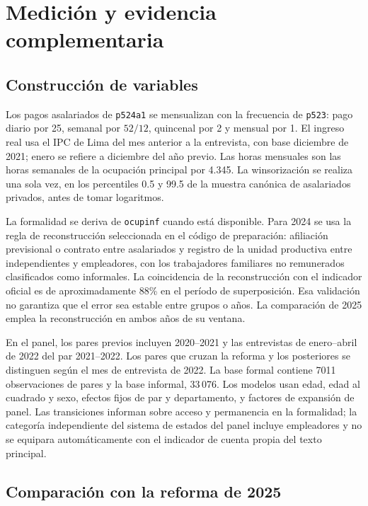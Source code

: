 \section{Medición y evidencia complementaria}
\label{app:short_measure}

\subsection{Construcción de variables}

Los pagos asalariados de \texttt{p524a1} se mensualizan con la frecuencia de \texttt{p523}: pago diario por 25, semanal por $52/12$, quincenal por 2 y mensual por 1. El ingreso real usa el IPC de Lima del mes anterior a la entrevista, con base diciembre de 2021; enero se refiere a diciembre del año previo. Las horas mensuales son las horas semanales de la ocupación principal por 4.345. La winsorización se realiza una sola vez, en los percentiles 0.5 y 99.5 de la muestra canónica de asalariados privados, antes de tomar logaritmos.

La formalidad se deriva de \texttt{ocupinf} cuando está disponible. Para 2024 se usa la regla de reconstrucción seleccionada en el código de preparación: afiliación previsional o contrato entre asalariados y registro de la unidad productiva entre independientes y empleadores, con los trabajadores familiares no remunerados clasificados como informales. La coincidencia de la reconstrucción con el indicador oficial es de aproximadamente 88\% en el período de superposición. Esa validación no garantiza que el error sea estable entre grupos o años. La comparación de 2025 emplea la reconstrucción en ambos años de su ventana.

En el panel, los pares previos incluyen 2020--2021 y las entrevistas de enero--abril de 2022 del par 2021--2022. Los pares que cruzan la reforma y los posteriores se distinguen según el mes de entrevista de 2022. La base formal contiene 7011 observaciones de pares y la base informal, 33\,076. Los modelos usan edad, edad al cuadrado y sexo, efectos fijos de par y departamento, y factores de expansión de panel. Las transiciones informan sobre acceso y permanencia en la formalidad; la categoría independiente del sistema de estados del panel incluye empleadores y no se equipara automáticamente con el indicador de cuenta propia del texto principal.

\subsection{Comparación con la reforma de 2025}


